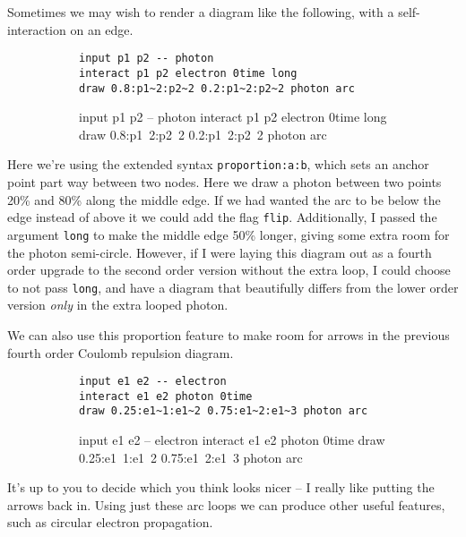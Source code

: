 \documentclass[12pt]{article}
\begin{document}
Sometimes we may wish to render a diagram like the following, with a self-interaction on an edge.
\begin{figure}[h!]\begin{subfigure}[h]{0.64\textwidth}\begin{center}
\begin{lstlisting}
input p1 p2 -- photon
interact p1 p2 electron 0time long
draw 0.8:p1~2:p2~2 0.2:p1~2:p2~2 photon arc
\end{lstlisting}
\end{center}\end{subfigure}\hfill\vrule\hfill\begin{subfigure}[h]{0.2\textwidth}\begin{center}
\begin{feynr}
input p1 p2 -- photon
interact p1 p2 electron 0time long
draw 0.8:p1~2:p2~2 0.2:p1~2:p2~2 photon arc
\end{feynr}
\end{center}\end{subfigure}\end{figure}
Here we're using the extended syntax \texttt{proportion:a:b}, which sets an anchor point part way between two nodes.
Here we draw a photon between two points 20\% and 80\% along the middle edge.
If we had wanted the arc to be below the edge instead of above it we could add the flag \texttt{flip}.
Additionally, I passed the argument \texttt{long} to make the middle edge 50\% longer, giving some extra room for the photon semi-circle.
However, if I were laying this diagram out as a fourth order upgrade to the second order version without the extra loop, I could choose to not pass \texttt{long}, and have a diagram that beautifully differs from the lower order version \emph{only} in the extra looped photon.

We can also use this proportion feature to make room for arrows in the previous fourth order Coulomb repulsion diagram.
\begin{figure}[h!]\begin{subfigure}[h]{0.66\textwidth}\begin{center}
\begin{lstlisting}
input e1 e2 -- electron
interact e1 e2 photon 0time
draw 0.25:e1~1:e1~2 0.75:e1~2:e1~3 photon arc
\end{lstlisting}
\end{center}\end{subfigure}\hfill\vrule\hfill\begin{subfigure}[h]{0.2\textwidth}\begin{center}
\begin{feynr}
input e1 e2 -- electron
interact e1 e2 photon 0time
draw 0.25:e1~1:e1~2 0.75:e1~2:e1~3 photon arc
\end{feynr}
\end{center}\end{subfigure}\end{figure}
It's up to you to decide which you think looks nicer -- I really like putting the arrows back in.
Using just these arc loops we can produce other useful features, such as circular electron propagation.
\end{document}
